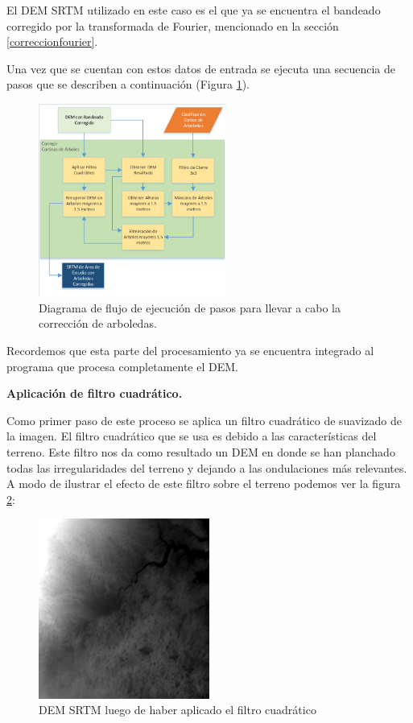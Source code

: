 \documentclass[10pt,a4paper, twoside]{report}
\begin{document}
El DEM SRTM utilizado en este caso es el que ya se encuentra el bandeado corregido por la transformada de Fourier, mencionado en la sección \ref{correccionfourier}.

Una vez que se cuentan con estos datos de entrada se ejecuta una secuencia de pasos que se describen a continuación (Figura \ref{DiagramaArboledas}). 

\begin{figure}[!htb]
   \centering      
   \includegraphics[width=0.55\textwidth]{imagenes/DiagramaArboleda.pdf}
 \caption{Diagrama de flujo de ejecución de pasos para llevar a cabo la corrección de arboledas.}
 \label{DiagramaArboledas}
\end{figure}

Recordemos que esta parte del procesamiento ya se encuentra integrado al programa que procesa completamente el DEM.

\textbf{Aplicación de filtro cuadrático.}

Como primer paso de este proceso se aplica un filtro cuadrático de suavizado de la imagen. El filtro cuadrático que se usa es debido a las características del terreno. Este filtro nos da como resultado un DEM en donde se han planchado todas las irregularidades del terreno y dejando a las ondulaciones más relevantes. A modo de ilustrar el efecto de este filtro sobre el terreno podemos ver la figura \ref{filtroCuadratico}:

\begin{figure}[H]
   \centering      
   \includegraphics[width=0.5\textwidth]{imagenes/filtroCuadratico.jpg}
 \caption{DEM SRTM luego de haber aplicado el filtro cuadrático}
 \label{filtroCuadratico}
\end{figure}
\end{document}
